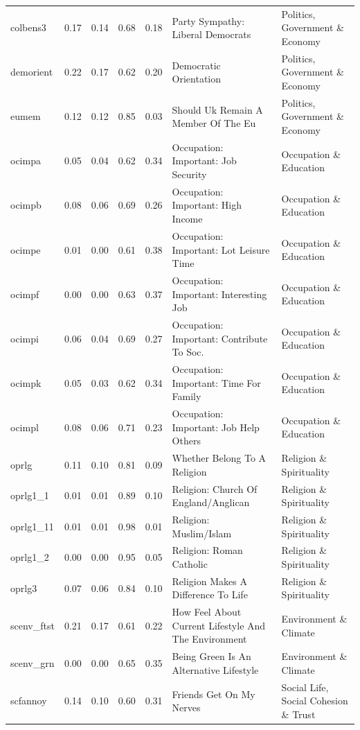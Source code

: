 \documentclass[
  12pt,
]{article}
\begin{document}
\begin{landscape}
\begin{scriptsize}
\begin{longtable}{|p{1.75in}|p{0.3in}|p{0.3in}|p{0.3in}|p{0.3in}|p{2.5in}|p{2.5in}}
colbens3 & 0.17 & 0.14 & 0.68 & 0.18 & Party Sympathy: Liberal Democrats & Politics, Government \& Economy \\ 
demorient & 0.22 & 0.17 & 0.62 & 0.20 & Democratic Orientation & Politics, Government \& Economy \\ 
eumem & 0.12 & 0.12 & 0.85 & 0.03 & Should Uk Remain A Member Of The Eu & Politics, Government \& Economy \\ 
ocimpa & 0.05 & 0.04 & 0.62 & 0.34 & Occupation: Important: Job Security & Occupation \& Education \\ 
ocimpb & 0.08 & 0.06 & 0.69 & 0.26 & Occupation: Important: High Income & Occupation \& Education \\ 
ocimpe & 0.01 & 0.00 & 0.61 & 0.38 & Occupation: Important: Lot Leisure Time & Occupation \& Education \\ 
ocimpf & 0.00 & 0.00 & 0.63 & 0.37 & Occupation: Important: Interesting Job & Occupation \& Education \\ 
ocimpi & 0.06 & 0.04 & 0.69 & 0.27 & Occupation: Important: Contribute To Soc. & Occupation \& Education \\ 
ocimpk & 0.05 & 0.03 & 0.62 & 0.34 & Occupation: Important: Time For Family & Occupation \& Education \\ 
ocimpl & 0.08 & 0.06 & 0.71 & 0.23 & Occupation: Important: Job Help Others & Occupation \& Education \\ 
oprlg & 0.11 & 0.10 & 0.81 & 0.09 & Whether Belong To A Religion & Religion \& Spirituality \\ 
oprlg1\_1 & 0.01 & 0.01 & 0.89 & 0.10 & Religion: Church Of England/Anglican & Religion \& Spirituality \\ 
oprlg1\_11 & 0.01 & 0.01 & 0.98 & 0.01 & Religion: Muslim/Islam & Religion \& Spirituality \\ 
oprlg1\_2 & 0.00 & 0.00 & 0.95 & 0.05 & Religion: Roman Catholic & Religion \& Spirituality \\ 
oprlg3 & 0.07 & 0.06 & 0.84 & 0.10 & Religion Makes A Difference To Life & Religion \& Spirituality \\ 
scenv\_ftst & 0.21 & 0.17 & 0.61 & 0.22 & How Feel About Current Lifestyle And The Environment & Environment \& Climate \\ 
scenv\_grn & 0.00 & 0.00 & 0.65 & 0.35 & Being Green Is An Alternative Lifestyle & Environment \& Climate \\ 
scfannoy & 0.14 & 0.10 & 0.60 & 0.31 & Friends Get On My Nerves & Social Life, Social Cohesion \& Trust \\ 

\end{longtable}
\end{scriptsize}
\end{landscape}
\end{document}
